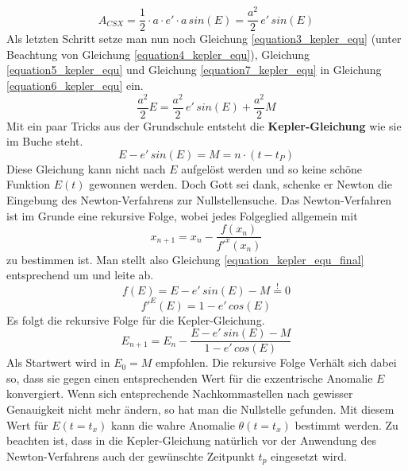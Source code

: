 \begin{equation}
	A_{CSX}=\frac{1}{2}\cdot a\cdot e' \cdot a\,sin(E)=\frac{a^2}{2}\,e'\,sin(E)
	\label{equation7_kepler_equ}
\end{equation}
Als letzten Schritt setze man nun noch Gleichung \ref{equation3_kepler_equ} (unter Beachtung von Gleichung \ref{equation4_kepler_equ}), Gleichung \ref{equation5_kepler_equ} und Gleichung \ref{equation7_kepler_equ} in Gleichung \ref{equation6_kepler_equ} ein.
\begin{equation}
	\frac{a^2}{2}E=\frac{a^2}{2}\,e'\,sin(E)+\frac{a^2}{2}M
	\label{equation8_kepler_equ}
\end{equation}
Mit ein paar Tricks aus der Grundschule entsteht die \textbf{Kepler-Gleichung} wie sie im Buche steht.
\begin{equation}
	E-e'\,sin(E)=M=n\cdot (t-t_P)
	\label{equation_kepler_equ_final}
\end{equation}
Diese Gleichung kann nicht nach \ensuremath{E} aufgelöst werden und so keine schöne Funktion \ensuremath{E(t)} gewonnen werden. Doch Gott sei dank, schenke er Newton die Eingebung des Newton-Verfahrens zur Nullstellensuche. Das Newton-Verfahren ist im Grunde eine rekursive Folge, wobei jedes Folgeglied allgemein mit
\begin{equation}
	x_{n+1}=x_n-\frac{f(x_n)}{f'^{x}(x_n)}
	\label{equation9_kepler_equ}
\end{equation}
zu bestimmen ist. Man stellt also Gleichung \ref{equation_kepler_equ_final} entsprechend um und leite ab.
\begin{equation}
	f(E)=E-e'\,sin(E)-M \stackrel{!}{=} 0
	\label{equation10_kepler_equ}
\end{equation}
\begin{equation}
	f'^{E}(E)=1-e'\,cos(E) 
	\label{equation11_kepler_equ}
\end{equation}
Es folgt die rekursive Folge für die Kepler-Gleichung. 
\begin{equation}
	E_{n+1}=E_n-\frac{E-e'\,sin(E)-M}{1-e'\,cos(E) }
	\label{equation12_kepler_equ}
\end{equation}
Als Startwert wird in \cite{HandRaum} \ensuremath{E_0=M} empfohlen. Die rekursive Folge Verhält sich dabei so, dass sie gegen einen entsprechenden Wert für die exzentrische Anomalie \ensuremath{E} konvergiert. Wenn sich entsprechende Nachkommastellen nach gewisser Genauigkeit nicht mehr ändern, so hat man die Nullstelle gefunden. Mit diesem Wert für \ensuremath{E(t=t_x)} kann die wahre Anomalie \ensuremath{\theta(t=t_x)} bestimmt werden. Zu beachten ist, dass in die Kepler-Gleichung natürlich vor der Anwendung des Newton-Verfahrens auch der gewünschte Zeitpunkt \ensuremath{t_p} eingesetzt wird.     
